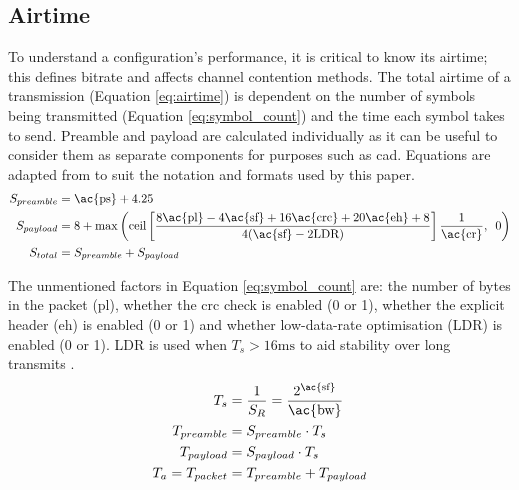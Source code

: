 \subsection{Airtime}\label{sec:airtime}
To understand a configuration's performance, it is critical to know its airtime; this defines bitrate and affects channel contention methods. The total airtime of a transmission (Equation \ref{eq:airtime}) is dependent on the number of symbols being transmitted (Equation \ref{eq:symbol_count}) and the time each symbol takes to send. Preamble and payload are calculated individually as it can be useful to consider them as separate components for purposes such as \ac{cad}. Equations are adapted from \cite{3YP:LORA_SX12} to suit the notation and formats used by this paper.
\begin{subequations}
\label{eq:symbol_count}
\begin{align}
	S_{preamble} &= \text{\ac{ps}} + 4.25 \\
	S_{payload} &= 8 + \max\left( \text{ceil}\left[ \frac{8\text{\ac{pl}}-4\text{\ac{sf}}+16\text{\ac{crc}}+20\text{\ac{eh}}+8}{4(\text{\ac{sf}}-2\text{LDR})}\right] \frac{1}{\text{\ac{cr}}},\enskip 0\right) \\
	S_{total} &= S_{preamble} + S_{payload} 
\end{align}
\end{subequations}

The unmentioned factors in Equation \ref{eq:symbol_count} are: the number of bytes in the packet (\ac{pl}), whether the \ac{crc} check is enabled (0 or 1), whether the explicit header (\ac{eh}) is enabled (0 or 1) and whether low-data-rate optimisation (LDR) is enabled (0 or 1). LDR is used when $T_s > 16\text{ms}$ to aid stability over long transmits \cite{3YP:LORA_SX12}.
\begin{subequations}
\label{eq:airtime}
\begin{align}
	T_{s} &= \frac{1}{S_R} = \frac{2^{\text{\ac{sf}}}}{\text{\ac{bw}}}\label{eq:symbol_time} \\
	T_{preamble} &=  S_{preamble}\cdot T_{s}\\
	T_{payload} &= S_{payload}\cdot T_{s} \\
	T_{a} = T_{packet} &= T_{preamble} + T_{payload}
\end{align}
\end{subequations}

